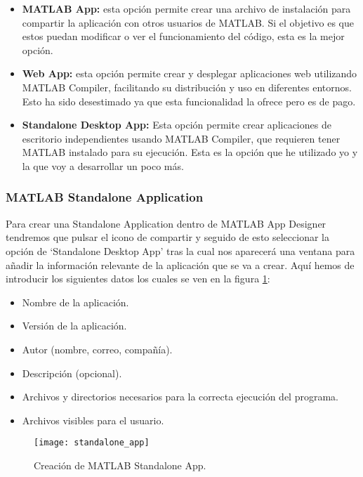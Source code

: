 \begin{itemize}
    \item \textbf{MATLAB App:} esta opción permite crear una archivo de instalación para compartir la aplicación con otros usuarios de MATLAB. Si el objetivo es que estos puedan modificar o ver el funcionamiento del código, esta es la mejor opción.
    \item \textbf{Web App:} esta opción permite crear y desplegar aplicaciones web utilizando MATLAB Compiler, facilitando su distribución y uso en diferentes entornos. Esto ha sido desestimado ya que esta funcionalidad la ofrece pero es de pago.
    \item \textbf{Standalone Desktop App:} Esta opción permite crear aplicaciones de escritorio independientes usando MATLAB Compiler, que requieren tener MATLAB instalado para su ejecución. Esta es la opción que he utilizado yo y la que voy a desarrollar un poco más.
\end{itemize}

\subsubsection{MATLAB Standalone Application}\label{matlab-standalone-application}

Para crear una Standalone Application dentro de MATLAB App Designer tendremos que pulsar el icono de compartir y seguido de esto seleccionar la opción de `Standalone Desktop App' tras la cual nos aparecerá una ventana para añadir la información relevante de la aplicación que se va a crear. Aquí hemos de introducir los siguientes datos los cuales se ven en la figura \ref{fig:standalone_app}:

\begin{itemize}
    \item Nombre de la aplicación.
    \item Versión de la aplicación.
    \item Autor (nombre, correo, compañía).
    \item Descripción (opcional).
    \item Archivos y directorios necesarios para la correcta ejecución del programa.
    \item Archivos visibles para el usuario.
\end{itemize}

\begin{figure}[h!]
  \centering
  \texttt{[image: standalone\_app]}
  \caption{Creación de MATLAB Standalone App.}
  \label{fig:standalone_app}
\end{figure}

